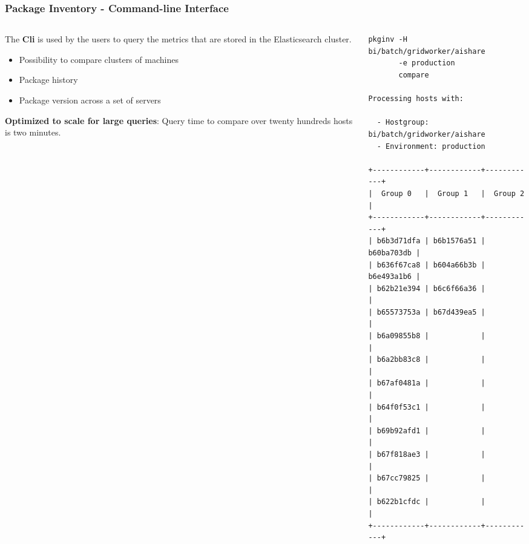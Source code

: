 \documentclass[aspectratio=169]{beamer}
\begin{document}
\begin{frame}[fragile]
    \frametitle{Package Inventory - Command-line Interface}
    \begin{minipage}[t]{0.95\textwidth}
        \begin{columns}
        \begin{column}{0.5\textwidth}
            The \textbf{Cli} is used by the users to query the metrics that are
            stored in the  Elasticsearch cluster.

            \begin{itemize}
                \item Possibility to compare clusters of machines
                \item Package history
                \item Package version across a set of servers
            \end{itemize}

            \textbf{Optimized to scale for large queries}:
            Query time to compare over twenty hundreds hosts is two minutes.
        \end{column}
        \begin{column}{0.5\textwidth}
            \linespread{1px}
            \begin{verbatim}
pkginv -H bi/batch/gridworker/aishare
       -e production
       compare

Processing hosts with:

  - Hostgroup: bi/batch/gridworker/aishare
  - Environment: production

+------------+------------+------------+
|  Group 0   |  Group 1   |  Group 2   |
+------------+------------+------------+
| b6b3d71dfa | b6b1576a51 | b60ba703db |
| b636f67ca8 | b604a66b3b | b6e493a1b6 |
| b62b21e394 | b6c6f66a36 |            |
| b65573753a | b67d439ea5 |            |
| b6a09855b8 |            |            |
| b6a2bb83c8 |            |            |
| b67af0481a |            |            |
| b64f0f53c1 |            |            |
| b69b92afd1 |            |            |
| b67f818ae3 |            |            |
| b67cc79825 |            |            |
| b622b1cfdc |            |            |
+------------+------------+------------+
            \end{verbatim}
        \end{column}
        \end{columns}
    \end{minipage}
\end{frame}
\end{document}
